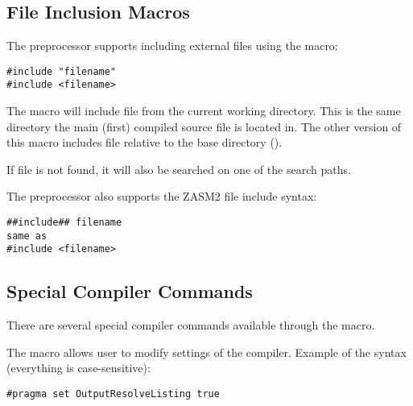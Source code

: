 \subsection{File Inclusion Macros}
The preprocessor supports including external files using the  macro:
\begin{verbatim}
#include "filename"
#include <filename>
\end{verbatim}

The  macro will include file from the current working directory. This is the same directory the main (first) compiled source file is located in. The other version of this macro includes file relative to the base directory ().

If file is not found, it will also be searched on one of the search paths.

The preprocessor also supports the ZASM2 file include syntax:
\begin{verbatim}
##include## filename
same as
#include <filename>
\end{verbatim}

\subsection{Special Compiler Commands}
There are several special compiler commands available through the  macro.

The  macro allows user to modify settings of the compiler. Example of the syntax (everything is case-sensitive):
\begin{verbatim}
#pragma set OutputResolveListing true
\end{verbatim}

